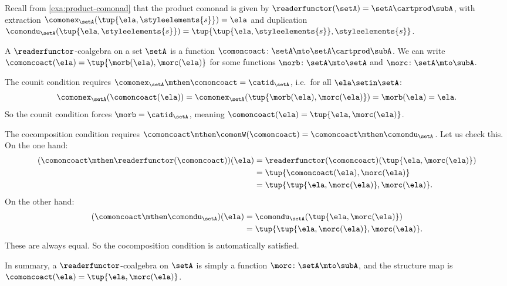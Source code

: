 \begin{example}
\label{exa:coalgebra-product-comonad}

Recall from \cref{exa:product-comonad} that the product comonad is given by $\readerfunctor(\setA) = \setA \cartprod \subA$, with extraction $\comonex_\setA(\tup{\ela, \styleelements{s}}) = \ela$ and duplication $\comondu_\setA(\tup{\ela, \styleelements{s}}) = \tup{\tup{\ela, \styleelements{s}}, \styleelements{s}}$.

A $\readerfunctor$-coalgebra on a set $\setA$ is a function $\comoncoact \colon \setA \mto \setA \cartprod \subA$. We can write $\comoncoact(\ela) = \tup{\morb(\ela), \morc(\ela)}$ for some functions $\morb \colon \setA \mto \setA$ and $\morc \colon \setA \mto \subA$.

The counit condition requires $\comonex_\setA \mthen \comoncoact = \catid_\setA$, i.e.\ for all $\ela \setin \setA$:
\begin{equation*}
    \comonex_\setA(\comoncoact(\ela)) = \comonex_\setA(\tup{\morb(\ela), \morc(\ela)}) = \morb(\ela) = \ela.
\end{equation*}
So the counit condition forces $\morb = \catid_\setA$, meaning $\comoncoact(\ela) = \tup{\ela, \morc(\ela)}$.

The cocomposition condition requires $\comoncoact \mthen \comonW(\comoncoact) = \comoncoact \mthen \comondu_\setA$. Let us check this. On the one hand:
\begin{align*}
(\comoncoact \mthen \readerfunctor(\comoncoact))(\ela)
& = \readerfunctor(\comoncoact)(\tup{\ela, \morc(\ela)}) \\
& = \tup{\comoncoact(\ela), \morc(\ela)} \\
& = \tup{\tup{\ela, \morc(\ela)}, \morc(\ela)}.
\end{align*}
On the other hand:
\begin{align*}
(\comoncoact \mthen \comondu_\setA)(\ela)
& = \comondu_\setA(\tup{\ela, \morc(\ela)}) \\
& = \tup{\tup{\ela, \morc(\ela)}, \morc(\ela)}.
\end{align*}
These are always equal. So the cocomposition condition is automatically satisfied.

In summary, a $\readerfunctor$-coalgebra on $\setA$ is simply a function $\morc \colon \setA \mto \subA$, and the structure map is $\comoncoact(\ela) = \tup{\ela, \morc(\ela)}$.
\end{example}


